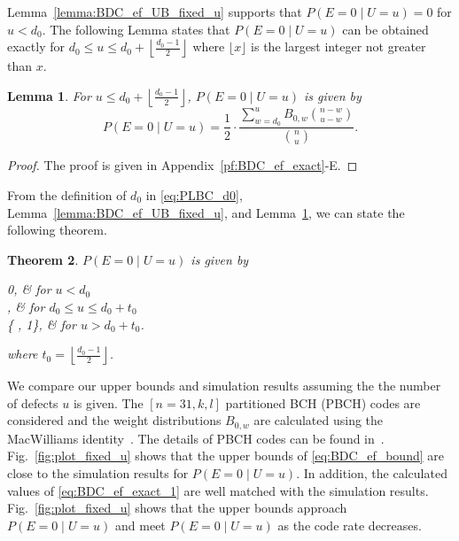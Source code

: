 \documentclass[10pt,twocolumn,twoside,submit]{JCNtran}
\newtheorem{theorem}{Theorem}
\newtheorem{lemma}[theorem]{Lemma}
\begin{document}
	Lemma~\ref{lemma:BDC_ef_UB_fixed_u} supports that $P\left(E=0 \mid U=u \right) = 0$ for $u < d_{0}$. The following Lemma states that $P\left(E=0 \mid U=u \right)$ can be obtained exactly for $d_0 \le u \le d_0 + \left\lfloor \frac{d_0-1}{2} \right\rfloor$ where $\lfloor x \rfloor$ is the largest integer not greater than $x$.
	
	\begin{lemma}\label{lemma:BDC_ef_exact}For $u \le d_0 + \left\lfloor \frac{d_0 - 1}{2} \right\rfloor$, $P\left(E=0 \mid U=u \right)$ is given by
	\begin{equation}
	\label{eq:BDC_ef_exact}
	P\left(E=0 \mid U=u \right) = \frac{1}{2} \cdot \frac{\sum_{w=d_{0}}^{u}{B_{0, w} \binom{n-w}{u-w}}}{\binom{n}{u}}.
	\end{equation}
	\end{lemma}
	\begin{proof}
	The proof is given in Appendix~\ref{pf:BDC_ef_exact}-E.
	\end{proof}

	From the definition of $d_0$ in \eqref{eq:PLBC_d0}, Lemma~\ref{lemma:BDC_ef_UB_fixed_u}, and Lemma~\ref{lemma:BDC_ef_exact}, we can state the following theorem.

	\begin{theorem}\label{thm:enc_fail_bound_fixed_u} $P\left(E = 0 \mid U=u\right)$ is given by		
		\begin{numcases}{\hspace{-6mm}}
		\hspace{-1mm}0, &\hspace{-6mm} for $u < d_0$ \label{eq:BDC_ef_exact_0}
		\\
		\hspace{-1mm} \cdot {},  &\hspace{-6mm} for $d_0 \le u \le d_0 + t_0$ \label{eq:BDC_ef_exact_1}
		\\
		\hspace{-1mm}\le \min \left\{ , 1\right\}\hspace{-1mm}, &\hspace{-6mm} for $ u > d_0 + t_0$. \label{eq:BDC_ef_bound}
		\end{numcases}
		where $t_0 = \left\lfloor \frac{d_0 - 1}{2} \right\rfloor$.
	\end{theorem}
	
	We compare our upper bounds and simulation results assuming the the number of defects $u$ is given. The $[n = 31, k, l]$ partitioned BCH (PBCH) codes are considered and the weight distributions $B_{0, w}$ are calculated using the MacWilliams identity~\cite{Macwilliams1977theory}. The details of PBCH codes can be found in~\cite{Heegard1983plbc}. Fig.~\ref{fig:plot_fixed_u} shows that the upper bounds of \eqref{eq:BDC_ef_bound} are close to the simulation results for $P(E=0 \mid U=u)$. In addition, the calculated values of \eqref{eq:BDC_ef_exact_1} are well matched with the simulation results. Fig.~\ref{fig:plot_fixed_u} shows that the upper bounds approach $P(E=0 \mid U=u)$ and meet $P(E=0 \mid U=u)$ as the code rate decreases.
	
\end{document}
